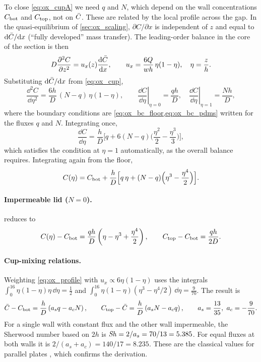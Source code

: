 To close \cref{eq:ox_cupA} we need $q$ and $N$, which depend on the wall concentrations $C_{\mathrm{bot}}$ and $C_{\mathrm{top}}$, not on $\bar C$. These are related by the local profile across the gap. In the quasi-equilibrium of \cref{sec:ox_scaling}, $\partial C/\partial x$ is independent of $z$ and equal to $\mathrm{d}\bar C/\mathrm{d} x$ (``fully developed'' mass transfer). The leading-order balance in the core of the section is then
\begin{equation}
D\frac{\partial^2C}{\partial z^2}=u_x(z)\frac{\mathrm{d}\bar C}{\mathrm{d} x},
\qquad u_x=\frac{6Q}{wh}\,\eta(1-\eta),\quad\eta=\frac zh .
\end{equation}
Substituting $\mathrm{d}\bar C/\mathrm{d} x$ from \cref{eq:ox_cup},
\begin{equation}
\frac{\dd^2C}{\dd\eta^2}=\frac{6h}{D}\,(N-q)\,\eta(1-\eta),
\qquad
\left.\frac{\dd C}{\dd\eta}\right|_{\eta=0}=\frac{qh}{D},\quad
\left.\frac{\dd C}{\dd\eta}\right|_{\eta=1}=\frac{Nh}{D},
\label{eq:ox_local_ode}
\end{equation}
where the boundary conditions are \cref{eq:ox_bc_floor,eq:ox_bc_pdms} written for the fluxes $q$ and $N$. Integrating once,
\begin{equation}
\frac{\dd C}{\dd\eta}=\frac hD\Big[q+6(N-q)\Big(\frac{\eta^2}{2}-\frac{\eta^3}{3}\Big)\Big],
\end{equation}
which satisfies the condition at $\eta=1$ automatically, as the overall balance requires. Integrating again from the floor,
\begin{equation}
C(\eta)=C_{\mathrm{bot}}+\frac hD\Big[q\,\eta+(N-q)\Big(\eta^3-\frac{\eta^4}{2}\Big)\Big].
\label{eq:ox_profile}
\end{equation}
\paragraph{Impermeable lid ($N=0$).}  reduces to
\begin{equation}
C(\eta)-C_{\mathrm{bot}}=\frac{qh}{D}\left(\eta-\eta^3+\frac{\eta^4}{2}\right),\qquad
C_{\mathrm{top}}-C_{\mathrm{bot}}=\frac{qh}{2D}.
\label{eq:ox_profile_imp}
\end{equation}
\paragraph{Cup-mixing relations.} Weighting \cref{eq:ox_profile} with $u_x\propto6\eta(1-\eta)$ uses the integrals $\int_0^16\eta(1-\eta)\eta\,\dd\eta=\tfrac12$ and $\int_0^16\eta(1-\eta)(\eta^3-\eta^4/2)\,\dd\eta=\tfrac{9}{70}$. The result is
\begin{equation}
\bar C-C_{\mathrm{bot}}=\frac hD\left(a_sq-a_cN\right),\qquad
C_{\mathrm{top}}-\bar C=\frac hD\left(a_sN-a_cq\right),\qquad
a_s=\frac{13}{35},\ a_c=-\frac{9}{70}.
\label{eq:ox_superpos}
\end{equation}
For a single wall with constant flux and the other wall impermeable, the Sherwood number based on $2h$ is $\mathit{Sh}=2/a_s=70/13=5.385$. For equal fluxes at both walls it is $2/(a_s+a_c)=140/17=8.235$. These are the classical values for parallel plates \citep{ShahLondon1978}, which confirms the derivation.

